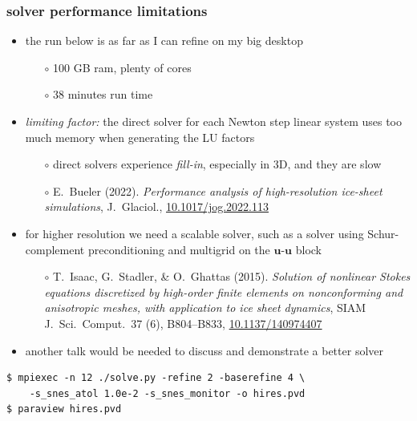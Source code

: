 \documentclass[10pt,
               hyperref={colorlinks,citecolor=DeepPink4,linkcolor=black,urlcolor=blue},
               svgnames]{beamer}
\newcommand{\bu}{\mathbf{u}}
\begin{document}
\begin{frame}[fragile]
\frametitle{solver performance limitations}

\begin{itemize}
\item the run below is as far as I can refine on my big desktop
    \begin{itemize}
    \item[$\circ$] 100 GB ram, plenty of cores
    \item[$\circ$] 38 minutes run time
    \end{itemize}
\item \alert{\emph{limiting factor:} the direct solver for each Newton step linear system uses too much memory when generating the LU factors}
    \begin{itemize}
    \item[$\circ$] direct solvers experience \emph{fill-in}, especially in 3D, and they are slow
    \item[$\circ$] {\scriptsize E.~Bueler (2022). \emph{Performance analysis of high-resolution ice-sheet simulations}, J.~Glaciol., \href{https://doi.org/10.1017/jog.2022.113}{10.1017/jog.2022.113}}
    \end{itemize}
\item for higher resolution we need a scalable solver, such as a solver using Schur-complement preconditioning and multigrid on the $\bu$-$\bu$ block
    \begin{itemize}
    \item[$\circ$] {\scriptsize T.~Isaac, G.~Stadler, \& O.~Ghattas (2015). \emph{Solution of nonlinear Stokes equations discretized by high-order finite elements on nonconforming and anisotropic meshes, with application to ice sheet dynamics}, SIAM J.~Sci.~Comput.~37 (6), B804--B833, \href{https://doi.org/10.1137/140974407}{10.1137/140974407}}
    \end{itemize}
\item another talk would be needed to discuss and demonstrate a better solver
\end{itemize}

\bigskip
\begin{Verbatim}
$ mpiexec -n 12 ./solve.py -refine 2 -baserefine 4 \
    -s_snes_atol 1.0e-2 -s_snes_monitor -o hires.pvd
$ paraview hires.pvd
\end{Verbatim}
\end{frame}
\end{document}
